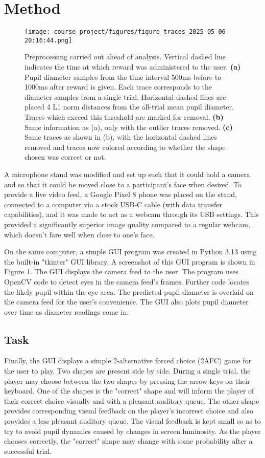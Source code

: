 \documentclass[10pt,letterpaper]{article}
\begin{document}
\section{Method}

\begin{figure*}[h]
    \centering
    \texttt{[image: course\_project/figures/figure\_traces\_2025-05-06 20:16:44.png]}
    \caption{Preprocessing carried out ahead of analysis. Vertical dashed line indicates the time at which reward was administered to the user.
    \textbf{(a)} Pupil diameter samples from the time interval 500ms before to 1000ms after reward is given. Each trace corresponds to the diameter samples from a single trial. Horizontal dashed lines are placed 4 L1 norm distances from the all-trial mean pupil diameter. Traces which exceed this threshold are marked for removal.
    \textbf{(b)} Same information as (a), only with the outlier traces removed.
    \textbf{(c)} Same traces as shown in (b), with the horizontal dashed lines removed and traces now colored according to whether the shape chosen was correct or not.
    }
    \label{fig:enter-label}
\end{figure*}

A microphone stand was modified and set up such that it could hold a camera and so that it could be moved close to a participant's face when desired. To provide a live video feed, a Google Pixel 8 phone was placed on the stand, connected to a computer via a stock USB-C cable (with data transfer capabilities), and it was made to act as a webcam through its USB settings. This provided a significantly superior image quality compared to a regular webcam, which doesn't fare well when close to one's face.

On the same computer, a simple GUI program was created in Python 3.13 using the built-in "tkinter" GUI library. A screenshot of this GUI program is shown in Figure 1. The GUI displays the camera feed to the user. The program uses OpenCV code to detect eyes in the camera feed's frames. Further code locates the likely pupil within the eye area. The predicted pupil diameter is overlaid on the camera feed for the user's convenience. The GUI also plots pupil diameter over time as diameter readings come in.

\subsection{Task}
Finally, the GUI displays a simple 2-alternative forced choice (2AFC) game for the user to play. Two shapes are present side by side. During a single trial, the player may choose between the two shapes by pressing the arrow keys on their keyboard. One of the shapes is the "correct" shape and will inform the player of their correct choice visually and with a pleasant auditory queue. The other shape provides corresponding visual feedback on the player's incorrect choice and also provides a less pleasant auditory queue. The visual feedback is kept small so as to try to avoid pupil dynamics caused by changes in screen luminosity. As the player chooses correctly, the "correct" shape may change with some probability after a successful trial.
\end{document}
